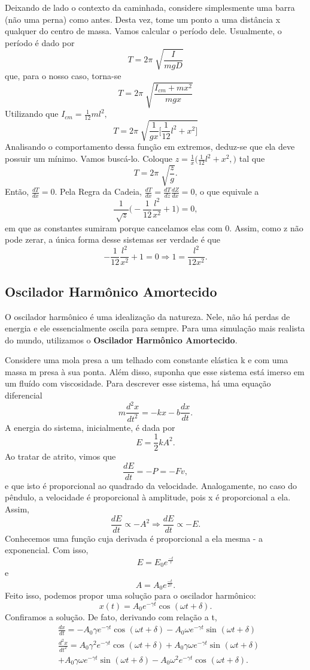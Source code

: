 \documentclass{article}
\begin{document}
Deixando de lado o contexto da caminhada, considere simplesmente uma barra (não uma perna) como antes. Desta vez,
tome um ponto a uma distância x qualquer do centro de massa. Vamos calcular o período dele.
Usualmente, o período é dado por 
\[
  T = 2\pi \sqrt[]{\frac{I}{mgD}} 
\]
que, para o nosso caso, torna-se 
\[
  T = 2\pi \sqrt[]{\frac{I_{cm}+mx^{2}}{mgx}}
\]
Utilizando que \(I_{cm}= \frac{1}{12}ml^{2},\) 
\[
  T = 2\pi \sqrt[]{\frac{1}{gx}\biggl[\frac{1}{12}l^{2}+x^{2}\biggr]} 
\]
Analisando o comportamento dessa função em extremos, deduz-se que ela deve possuir um mínimo. Vamos buscá-lo.
Coloque \(z = \frac{1}{x}\biggl(\frac{1}{12}l^{2}+x^{2},\biggr)\) tal que 
\[
  T = 2\pi \sqrt[]{\frac{z}{g}}.
\]
Então, \(\frac{dT}{dx}=0\). Pela Regra da Cadeia, \(\frac{dT}{dx} = \frac{dT}{dz}\frac{dZ}{dx} = 0\), o que equivale a 
\[
  \frac{1}{\sqrt[]{z}}\biggl(-\frac{1}{12}\frac{l^{2}}{x^{2}}+1\biggr) = 0,
\]
em que as constantes sumiram porque cancelamos elas com 0. Assim, como z não pode zerar, a única forma desse sistemas ser verdade é que 
\[
  -\frac{1}{12}\frac{l^{2}}{x^{2}}+1 = 0 \Rightarrow 1 = \frac{l^{2}}{12x^{2}}.
\]
\subsection{Oscilador Harmônico Amortecido}
O oscilador harmônico é uma idealização da natureza. Nele, não há perdas de energia e ele essencialmente
oscila para sempre. Para uma simulação mais realista do mundo, utilizamos o \textbf{Oscilador Harmônico Amortecido}.

Considere uma mola presa a um telhado com constante elástica k e com uma massa m presa à sua ponta. Além disso, suponha que
esse sistema está imerso em um fluído com viscosidade. Para descrever esse sistema, há uma equação diferencial 
\[
  m \frac{d^{2}x}{dt^{2}} = -kx - b \frac{dx}{dt}.
\]
A energia do sistema, inicialmente, é dada por 
\[
  E = \frac{1}{2}kA^{2}.
\]
Ao tratar de atrito, vimos que 
\[
  \frac{dE}{dt} = - P = - Fv, 
\]
e que isto é proporcional ao quadrado da velocidade. Analogamente, no caso do pêndulo, a velocidade é proporcional à amplitude, pois x 
é proporcional a ela. Assim, 
\[
  \frac{dE}{dt}\propto -A^{2} \Rightarrow \frac{dE}{dt}\propto -E.
\]
Conhecemos uma função cuja derivada é proporcional a ela mesma - a exponencial. Com isso,  
\[
  E = E_{0} e^{\frac{-t}{\tau }}
\]
e 
\[
  A = A_{0} e^{\frac{-t}{2\tau }}.
\]
Feito isso, podemos propor uma solução para o oscilador harmônico:
\[
  x(t) = A_{0}e^{-\gamma t}\cos^{}{(\omega t + \delta )}.
\]
Confiramos a solução. De fato, derivando com relação a t,
\begin{align*}
   &\frac{dx}{dt} = -A_{0}\gamma e^{-\gamma t}\cos^{}{(\omega t + \delta )}-A_{0}\omega e^{-\gamma t}\sin^{}{(\omega t + \delta )}\\
   &\frac{d^{2}x}{dt^{2}} = A_{0}\gamma ^{2}e^{-\gamma t}\cos^{}{(\omega t + \delta )} + A_{0}\gamma \omega e^{-\gamma t}\sin^{}{(\omega t + \delta )}\\
   &+A_{0}\gamma\omega e^{-\gamma t}\sin^{}{(\omega t+\delta )}-A_{0}\omega ^{2}e^{-\gamma t}\cos^{}{(\omega t + \delta )}.
\end{align*}
\end{document}
